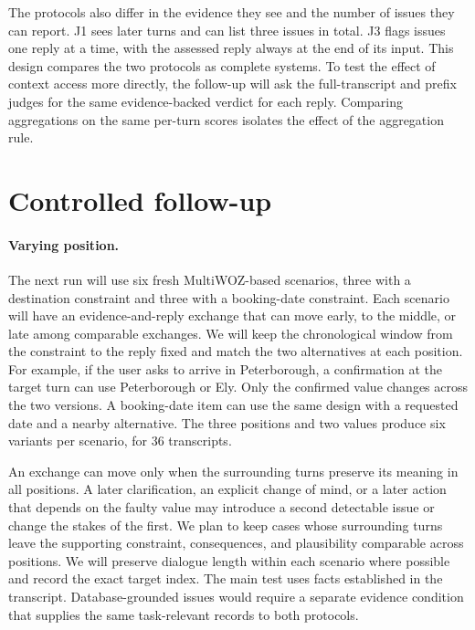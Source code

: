 \documentclass[11pt]{article}
\begin{document}
The protocols also differ in the evidence they see and the number of issues they can report. J1 sees later turns and can list three issues in total. J3 flags issues one reply at a time, with the assessed reply always at the end of its input. This design compares the two protocols as complete systems. To test the effect of context access more directly, the follow-up will ask the full-transcript and prefix judges for the same evidence-backed verdict for each reply. Comparing aggregations on the same per-turn scores isolates the effect of the aggregation rule.

\section{Controlled follow-up}

\paragraph{Varying position.}
The next run will use six fresh MultiWOZ-based scenarios, three with a destination constraint and three with a booking-date constraint. Each scenario will have an evidence-and-reply exchange that can move early, to the middle, or late among comparable exchanges. We will keep the chronological window from the constraint to the reply fixed and match the two alternatives at each position. For example, if the user asks to arrive in Peterborough, a confirmation at the target turn can use Peterborough or Ely. Only the confirmed value changes across the two versions. A booking-date item can use the same design with a requested date and a nearby alternative. The three positions and two values produce six variants per scenario, for 36 transcripts.

An exchange can move only when the surrounding turns preserve its meaning in all positions. A later clarification, an explicit change of mind, or a later action that depends on the faulty value may introduce a second detectable issue or change the stakes of the first. We plan to keep cases whose surrounding turns leave the supporting constraint, consequences, and plausibility comparable across positions. We will preserve dialogue length within each scenario where possible and record the exact target index. The main test uses facts established in the transcript. Database-grounded issues would require a separate evidence condition that supplies the same task-relevant records to both protocols.
\end{document}
